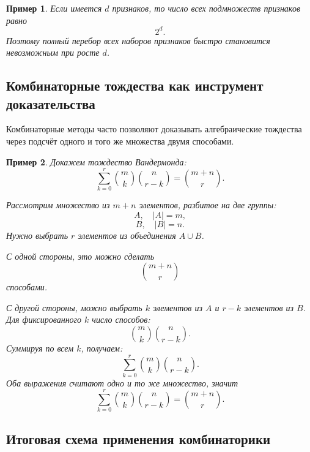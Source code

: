 \documentclass[12pt,a4paper]{article}
\newtheorem{example}{Пример}
\begin{document}
\begin{example}
Если имеется $d$ признаков, то число всех подмножеств признаков равно
\[
2^d.
\]
Поэтому полный перебор всех наборов признаков быстро становится невозможным при росте $d$.
\end{example}

\subsection{Комбинаторные тождества как инструмент доказательства}

Комбинаторные методы часто позволяют доказывать алгебраические тождества через подсчёт одного и того же множества двумя способами.

\begin{example}
Докажем тождество Вандермонда:
\[
\sum_{k=0}^{r}\binom{m}{k}\binom{n}{r-k}
=
\binom{m+n}{r}.
\]

Рассмотрим множество из $m+n$ элементов, разбитое на две группы:
\[
A,\quad |A|=m,
\]
\[
B,\quad |B|=n.
\]
Нужно выбрать $r$ элементов из объединения $A\cup B$.

С одной стороны, это можно сделать
\[
\binom{m+n}{r}
\]
способами.

С другой стороны, можно выбрать $k$ элементов из $A$ и $r-k$ элементов из $B$. Для фиксированного $k$ число способов:
\[
\binom{m}{k}\binom{n}{r-k}.
\]
Суммируя по всем $k$, получаем:
\[
\sum_{k=0}^{r}\binom{m}{k}\binom{n}{r-k}.
\]
Оба выражения считают одно и то же множество, значит
\[
\sum_{k=0}^{r}\binom{m}{k}\binom{n}{r-k}
=
\binom{m+n}{r}.
\]
\end{example}

\subsection{Итоговая схема применения комбинаторики}
\end{document}

